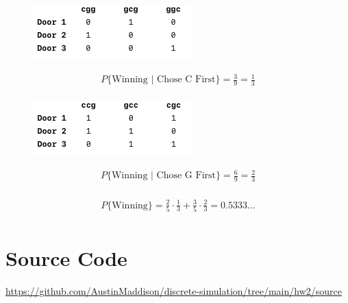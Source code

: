 \documentclass{article}
\begin{document}
\vspace{15pt}
\begin{multicols}{2}
\begin{figure}[H]
	\centering
	\includegraphics[width=0.75\linewidth]{../drawings/p3_2}
\end{figure}
\vspace{-25pt}
\begin{align*}
P\{\text{Winning | Chose C First}\} = \frac{3}{9} = \frac{1}{3}\\
\end{align*}



\columnbreak
\begin{figure}[H]
	\centering
	\includegraphics[width=0.75\linewidth]{../drawings/p3_3}
\end{figure}
\vspace{-25pt}
\begin{align*}
P\{\text{Winning | Chose G First}\} = \frac{6}{9} = \frac{2}{3} \\
\end{align*}

\end{multicols}

\begin{align*}
	P\{\text{Winning}\} = \frac{2}{5}  \cdot \frac{1}{3} + \frac{3}{5}  \cdot \frac{2}{3} = 0.5333...\\
\end{align*}



\section*{Source Code}
\href{https://github.com/AustinMaddison/discrete-simulation/tree/main/hw2/source}{https://github.com/AustinMaddison/discrete-simulation/tree/main/hw2/source}

%
%
\end{document}
